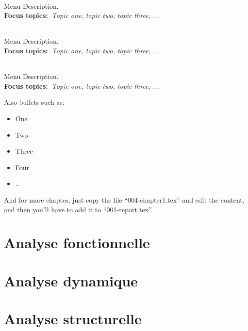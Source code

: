 \begin{description}\addtolength{\itemsep}{-0.35\baselineskip}%
  \item[\textbullet~\bfseries Menu Item] \hfill \\%
        Menu Description.~\\%
        {\textbf{Focus topics:~}\emph{Topic one, topic two, topic three, ...}}%
  \item[\textbullet~\bfseries Menu Item] \hfill \\%
        Menu Description.~\\%
        {\textbf{Focus topics:~}\emph{Topic one, topic two, topic three, ...}}%
  \item[\textbullet~\bfseries Menu Item] \hfill \\%
        Menu Description.~\\%
        {\textbf{Focus topics:~}\emph{Topic one, topic two, topic three, ...}}%
\end{description}

Also bullets such as:%
\begin{itemize}\addtolength{\itemsep}{-0.35\baselineskip}%
  \item One%
  \item Two%
  \item Three%
  \item Four%
  \item \ldots%
\end{itemize}%
%

And for more chaptes, just copy the file ``004-chapter1.tex'' and edit the content, and then you'll have to add it to ``001-report.tex''.

\section{Analyse fonctionnelle }

\section{Analyse dynamique  }

\section{Analyse structurelle   }
